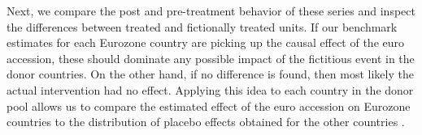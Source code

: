\documentclass[12pt]{article}
\begin{document}
Next, we compare the post and pre-treatment behavior of these series and inspect the differences between treated and fictionally treated units. If our benchmark estimates for each Eurozone country are picking up the causal effect of the euro accession, these should dominate any possible impact of the fictitious event in the donor countries. On the other hand, if no difference is found, then most likely the actual intervention had no effect. Applying this idea to each country in the donor pool allows us to compare the estimated effect of the euro accession on Eurozone countries to the distribution of placebo effects obtained for the other countries \citep{Abadie2015}.

\end{document}
